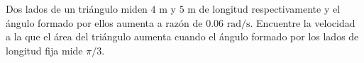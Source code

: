 \item Dos lados de un triángulo miden $4 \text{ m}$ y $5 \text{ m}$ de longitud respectivamente y el ángulo formado por ellos aumenta a razón de $0.06 \text{ rad/s}$. Encuentre la velocidad a la que el área del triángulo aumenta cuando el ángulo formado por los lados de longitud fija mide $\pi/3$.
